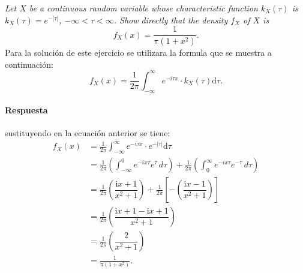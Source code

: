 \documentclass{article}
\begin{document}
\textit{Let $X$ be a continuous random variable whose characteristic function $k_X (\tau)$ is $k_X(\tau) = e^{-|\tau|}$, $-\infty < \tau < \infty$. Show directly that the density $f_X$ of $X$ is}
  \begin{equation*}
      f_X(x) = \frac{1}{\pi (1+x^2)}.
  \end{equation*}
Para la solución de este ejercicio se utilizara la formula que se muestra a continuación:
  \begin{equation}
      f_X(x) = \frac{1}{2\pi}\displaystyle\int_{-\infty}^\infty e^{-i\tau x}\cdot k_{X}(\tau)\mathrm{d}\tau .
  \end{equation}
\paragraph{Respuesta}  sustituyendo en la ecuación anterior se tiene: 
  \begin{align}
      f_X(x) &= \frac{1}{2\pi}\displaystyle\int_{-\infty}^\infty e^{-i\tau x}\cdot e^{-|\tau|}\mathrm{d}\tau \\ 
             &=\frac{1}{2\pi} \left( \int_{-\infty}^{0}e^{-ix\tau} e^{\tau}\, d\tau \right) + \frac{1}{2\pi} \left( \int_{0}^{\infty}e^{-ix\tau} e^{-\tau}\, d\tau \right)  \\
            &= \frac{1}{2\pi} \left(\dfrac{\mathrm{i}x+1}{x^2+1}\right)+\frac{1}{2\pi}\left[- \left(\dfrac{\mathrm{i}x-1}{x^2+1}\right)\right]\\
            &=\frac{1}{2\pi}\left( \dfrac{\mathrm{i}x+1 -\mathrm{i}x +1}{x^2+1} \right)\\
            &= \frac{1}{2\pi}\left( \dfrac{2}{x^2+1} \right)\\
            &= \frac{1}{\pi (1+x^2)}.
  \end{align}



   
\newpage


\end{document}
